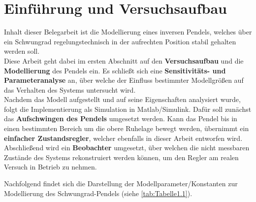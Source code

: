\pagestyle{aaron}
\section{Einführung und Versuchsaufbau} \label{sec:Einfuehrung}

Inhalt dieser Belegarbeit ist die Modellierung eines inversen Pendels, welches über ein Schwungrad regelungstechnisch in der aufrechten Position stabil gehalten werden soll. \\

Diese Arbeit geht dabei im ersten Abschnitt auf den \textbf{Versuchsaufbau} und die \textbf{Modellierung} des Pendels ein. Es schließt sich eine \textbf{Sensitivitäts- und Parameteranalyse} an, über welche der Einfluss bestimmter Modellgrößen auf das Verhalten des Systems untersucht wird. \\
Nachdem das Modell aufgestellt und auf seine Eigenschaften analysiert wurde, folgt die Implementierung als Simulation in Matlab/Simulink. Dafür soll zunächst das \textbf{Aufschwingen des Pendels} umgesetzt werden. Kann das Pendel bis in einen bestimmten Bereich um die obere Ruhelage bewegt werden, übernimmt ein \textbf{einfacher Zustandsregler}, welcher ebenfalls in dieser Arbeit entworfen wird. \\
Abschließend wird ein \textbf{Beobachter} umgesetzt, über welchen die nicht messbaren Zustände des Systems rekonstruiert werden können, um den Regler am realen Versuch in Betrieb zu nehmen.

Nachfolgend findet sich die Darstellung der Modellparameter/Konstanten zur Modellierung des Schwungrad-Pendels (siehe \autoref{tab:Tabelle1.1}).

